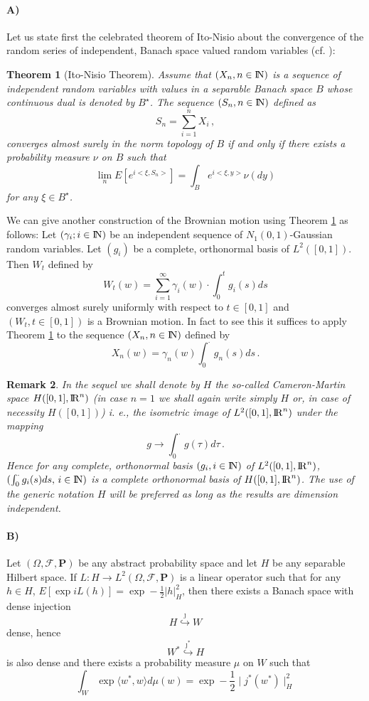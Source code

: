 \documentclass[12pt,a4paper]{book}
\def\P{{\mathbf P}}
\newtheorem{theorem}{Theorem}[section]
\newtheorem{remarkk}[theorem]{Remark}
\newcommand{\NN}{{\rm I\!N}}
\newcommand{\R}{{\rm I\!R}}
\newcommand{\N}{{\rm I\!N}}
\begin{document}
\paragraph{A)}
Let us state first the celebrated theorem of Ito-Nisio about the
convergence of the random series of independent, Banach space valued
random variables (cf. \cite{I-N}):
\begin{theorem}[Ito-Nisio Theorem]
\label{Ito-N-thm}
Assume that $(X_n,n\in \NN)$ is a sequence of independent random
variables with values in a separable Banach space $B$ whose continuous
dual is denoted by $B^\star$. The sequence 
 $(S_n,n\in \NN)$ defined  as 
$$
S_n=\sum_{i=1}^nX_i\,,
$$
converges almost surely in the norm topology of $B$ if and only if
there exists a probability measure $\nu$ on $B$ such that
$$
\lim_n E\left[e^{i<\xi,S_n>}\right]=\int_B e^{i<\xi,y>}\nu(dy)
$$
for any $\xi\in B^\star$.
\end{theorem}
We can give another construction of the Brownian motion using Theorem
\ref{Ito-N-thm} as follows: Let $(\gamma_i;i\in\N)$ be an independent
sequence of $N_1(0,1)$-Gaussian  random variables. Let $(g_i)$ be a
complete, orthonormal basis  of $L^2([0,1])$. Then $W_t$ defined by
$$
W_t(w)=\sum_{i=1}^\infty \gamma_i(w)\cdot\int_0^t g_i(s)ds
$$
converges almost surely uniformly with respect to $t\in [0,1]$  and
$(W_t, t\in [0,1])$ is a Brownian motion. In fact to see this it
suffices to apply Theorem \ref{Ito-N-thm} to the sequence $(X_n,n\in
\NN)$ defined by
$$
X_n(w)=\gamma_n(w)\int_0^\cdot g_n(s)ds\,.
$$

\begin{remarkk}{\rm
In the sequel we shall denote by $H$ the so-called
Cameron-Martin space $H([0,1],\R^n)$ (in case $n=1$ we shall again
write simply $H$ or, in case of necessity $H([0,1])$) i. e., the
isometric image of 
$L^2([0,1],\R^n)$ under the mapping 
$$
g\to\int_0^\cdot g(\tau)d\tau\,.
$$ 
Hence for any  complete, orthonormal
basis $(g_i,i\in\N)$  of $L^2([0,1],\R^n)$,
$(\int_0^\cdot g_i(s)ds,\,i\in \N )$ is a complete orthonormal basis
of $H([0,1],\R^n)$. The use of the generic notation $H$ will be
preferred as long as the results are dimension independent.}
\end{remarkk}

\paragraph{B)}
Let $(\Omega,{\mathcal F},\P)$ be any abstract probability space and
let $H$ be any separable Hilbert space. If
$L:H\!\to\!L^2(\Omega,{\mathcal F},\P)$ is a linear operator such that
for any $h\in H$, $E[\exp iL(h)]=\exp-\frac{1}{2}|h|^2_H$, then there
exists a Banach space with dense injection
$$
H\stackrel{\scriptstyle \jmath}{\hookrightarrow}W
$$
dense, hence
$$
W^\ast\stackrel{\scriptstyle \jmath^\ast}{\hookrightarrow}H
$$
is also dense  and there exists  a probability measure $\mu$ on $W$ such that
$$
\int_W\exp\langle w^\ast,w\rangle
d\mu(w)=\exp-{\textstyle\frac{1}{2}} \mid j^\ast(w^\ast)\mid_H^2
$$
\end{document}
